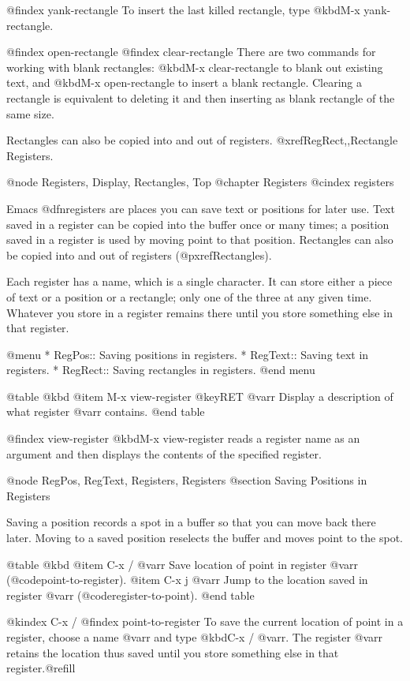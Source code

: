 {{{{{{{@findex yank-rectangle
  To insert the last killed rectangle, type @kbd{M-x yank-rectangle}.

@findex open-rectangle
@findex clear-rectangle
  There are two commands for working with blank rectangles: @kbd{M-x
clear-rectangle} to blank out existing text, and @kbd{M-x open-rectangle}
to insert a blank rectangle.  Clearing a rectangle is equivalent to
deleting it and then inserting as blank rectangle of the same size.

  Rectangles can also be copied into and out of registers.
@xref{RegRect,,Rectangle Registers}.

@node Registers, Display, Rectangles, Top
@chapter Registers
@cindex registers

  Emacs @dfn{registers} are places you can save text or positions for
later use.  Text saved in a register can be copied into the buffer
once or many times; a position saved in a register is used by moving
point to that position.  Rectangles can also be copied into and out of
registers (@pxref{Rectangles}).

  Each register has a name, which is a single character.  It can store
either a piece of text or a position or a rectangle; only one of the three
at any given time.  Whatever you store in a register remains there until
you store something else in that register.

@menu
* RegPos::    Saving positions in registers.
* RegText::   Saving text in registers.
* RegRect::   Saving rectangles in registers.
@end menu

@table @kbd
@item M-x view-register @key{RET} @var{r}
Display a description of what register @var{r} contains.
@end table

@findex view-register
  @kbd{M-x view-register} reads a register name as an argument and then
displays the contents of the specified register.

@node RegPos, RegText, Registers, Registers
@section Saving Positions in Registers

  Saving a position records a spot in a buffer so that you can move
back there later.  Moving to a saved position reselects the buffer
and moves point to the spot.

@table @kbd
@item C-x / @var{r}
Save location of point in register @var{r} (@code{point-to-register}).
@item C-x j @var{r}
Jump to the location saved in register @var{r} (@code{register-to-point}).
@end table

@kindex C-x /
@findex point-to-register
  To save the current location of point in a register, choose a name
@var{r} and type @kbd{C-x / @var{r}}.  The register @var{r} retains
the location thus saved until you store something else in that
register.@refill

}}}}}}}
